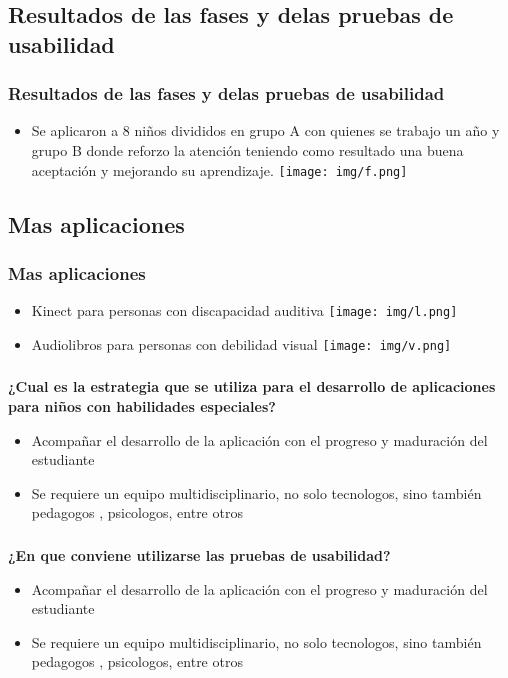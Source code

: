 \documentclass[11pt]{beamer}
\begin{document}
\begin{frame}
\section{Resultados de las fases y delas pruebas de usabilidad}
\frametitle{Resultados de las fases y delas pruebas de usabilidad}
\begin{itemize}
\item Se aplicaron a 8 niños divididos en grupo A con quienes se trabajo un año y grupo B donde reforzo la atención teniendo como resultado una buena aceptación y mejorando su aprendizaje.
{\texttt{[image: img/f.png]}}

\end{itemize}
\end{frame}

\begin{frame}
\section{Mas aplicaciones}
\frametitle{Mas aplicaciones}
\begin{itemize}
\item Kinect para personas con discapacidad auditiva
{\texttt{[image: img/l.png]}}
\item Audiolibros para personas con debilidad visual
{\texttt{[image: img/v.png]}}
\end{itemize}
\end{frame}

\begin{frame}

\frametitle{}
\textbf{¿Cual es la estrategia que se utiliza para el desarrollo de aplicaciones para niños con habilidades especiales?}
\begin{itemize}
\item Acompañar el desarrollo de la aplicación  con el progreso y maduración del estudiante
\item Se requiere un equipo multidisciplinario, no solo tecnologos, sino también pedagogos , psicologos, entre otros
\end{itemize}


\end{frame}

\begin{frame}
\frametitle{}

\textbf{¿En que conviene utilizarse las pruebas de usabilidad?}
\begin{itemize}
\item Acompañar el desarrollo de la aplicación  con el progreso y maduración del estudiante
\item Se requiere un equipo multidisciplinario, no solo tecnologos, sino también pedagogos , psicologos, entre otros
\end{itemize}


\end{frame}
\end{document}
